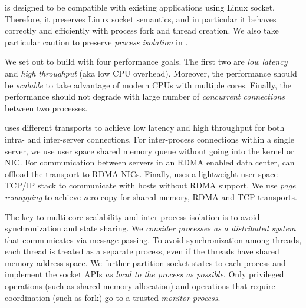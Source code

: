 \sys is designed to be compatible with existing applications using Linux socket. Therefore, it preserves Linux socket semantics, and in particular it behaves correctly and efficiently with process fork and thread creation. We also take particular caution to preserve \textit{process isolation} in \sys.


We set out to build \sys{} with four performance goals. The first two are \textit{low latency} and \textit{high throughput} (aka low CPU overhead). Moreover, the performance should be \textit{scalable} to take advantage of modern CPUs with multiple cores. Finally, the performance should not degrade with large number of \textit{concurrent connections} between two processes.


\sys{} uses different transports to achieve low latency and high throughput for both intra- and inter-server connections. For inter-process connections within a single server, we use user space shared memory queue without going into the kernel or NIC. For communication between servers in an RDMA enabled data center, \sys can offload the transport to RDMA NICs. Finally, \sys uses a lightweight user-space TCP/IP stack to communicate with hosts without RDMA support. We use \textit{page remapping} to achieve zero copy for shared memory, RDMA and TCP transports.

The key to multi-core scalability and inter-process isolation is to avoid synchronization and state sharing. We \textit{consider processes as a distributed system} that communicates via message passing. To avoid synchronization among threads, each thread is treated as a separate process, even if the threads have shared memory address space. We further partition socket states to each process and implement the socket APIs \textit{as local to the process as possible}. Only privileged operations (such as shared memory allocation) and operations that require coordination (such as fork) go to a trusted \textit{monitor process}.

